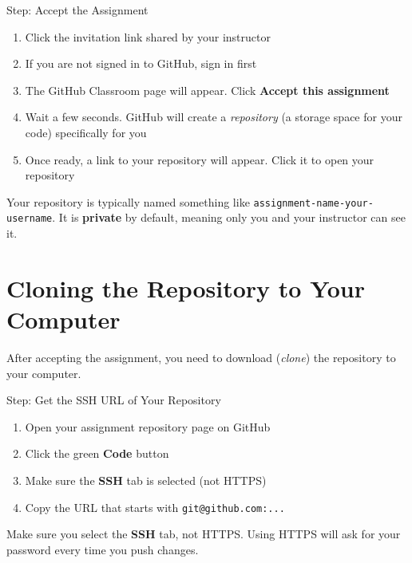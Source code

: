 \documentclass[
    a4paper,
    11pt,
    parskip=half
]{scrartcl}
\begin{document}
\begin{stepbox}{Step: Accept the Assignment}
\begin{enumerate}
    \item Click the invitation link shared by your instructor
    \item If you are not signed in to GitHub, sign in first
    \item The GitHub Classroom page will appear. Click \textbf{Accept this assignment}
    \item Wait a few seconds. GitHub will create a \textit{repository} (a storage space for your code) specifically for you
    \item Once ready, a link to your repository will appear. Click it to open your repository
\end{enumerate}
\end{stepbox}

\begin{notebox}
Your repository is typically named something like \texttt{assignment-name-your-username}. It is \textbf{private} by default, meaning only you and your instructor can see it.
\end{notebox}

\section{Cloning the Repository to Your Computer}
\label{sec:clone}

After accepting the assignment, you need to download (\textit{clone}) the repository to your computer.

\begin{stepbox}{Step: Get the SSH URL of Your Repository}
\begin{enumerate}
    \item Open your assignment repository page on GitHub
    \item Click the green \textbf{Code} button
    \item Make sure the \textbf{SSH} tab is selected (not HTTPS)
    \item Copy the URL that starts with \texttt{git@github.com:...}
\end{enumerate}
\end{stepbox}

\begin{warningbox}
Make sure you select the \textbf{SSH} tab, not HTTPS. Using HTTPS will ask for your password every time you push changes.
\end{warningbox}
\end{document}
